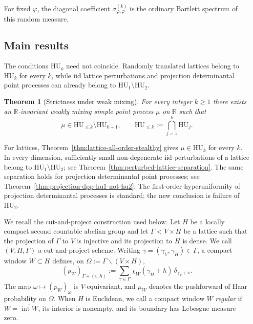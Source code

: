 \documentclass[11pt,reqno,a4paper]{amsart}
\numberwithin{equation}{section}
\theoremstyle{compact}
\newtheorem{maintheorem}{Theorem}
\theoremstyle{definition}
\theoremstyle{definition}
\newcommand{\HU}{\mathrm{HU}}
\begin{document}
For fixed $\varphi$, the diagonal coefficient
$\sigma^{(k)}_{\varphi,\varphi}$ is the ordinary Bartlett spectrum of this
random measure.

\subsection{Main results}
\label{subsec:intro-main-results}

The conditions $\HU_k$ need not coincide.  Randomly translated lattices
belong to $\HU_k$ for every $k$, while iid lattice perturbations and
projection determinantal point processes can already belong to
$\HU_1\setminus\HU_2$.

\begin{maintheorem}[Strictness under weak mixing]
\label{thm:intro-weak-mixing}
For every integer $k\geq1$ there exists an $\mathbb R$-invariant weakly
mixing simple point process $\mu$ on $\mathbb R$ such that
\begin{equation}\label{eq:intro-weak-mixing}
  \mu\in\HU_{\leq k}\setminus\HU_{k+1},
  \qquad
  \HU_{\leq k}:=\bigcap_{j=1}^k\HU_j.
\end{equation}
\end{maintheorem}

For lattices, Theorem~\ref{thm:lattice-all-order-stealthy} gives
$\mu\in\HU_k$ for every $k$.  In every dimension, sufficiently small
non-degenerate iid perturbations of a lattice belong to
$\HU_1\setminus\HU_2$; see Theorem~\ref{thm:perturbed-lattice-separation}.  The same separation holds
for projection determinantal point processes; see
Theorem~\ref{thm:projection-dpp-hu1-not-hu2}.  The first-order
hyperuniformity of projection determinantal processes is standard; the new
conclusion is failure of $\HU_2$.

We recall the cut-and-project construction used below.  Let $H$ be a locally
compact second countable abelian group and let $\Gamma<V\times H$ be a
lattice such that the projection of $\Gamma$ to $V$ is injective and its
projection to $H$ is dense.  We call $(V,H,\Gamma)$ a cut-and-project
scheme.  Writing $\gamma=(\gamma_V,\gamma_H)\in\Gamma$, a compact window
$W\subset H$ defines, on $\Omega:=\Gamma\backslash(V\times H)$,
\[
  (p_W)_{\Gamma+(v,h)}
  :=\sum_{\gamma\in\Gamma}
     \chi_W(\gamma_H+h)\,\delta_{\gamma_V+v}.
\]
The map $\omega\mapsto(p_W)_\omega$ is $V$-equivariant, and $\mu_W$ denotes
the pushforward of Haar probability on $\Omega$.  When $H$ is Euclidean, we
call a compact window $W$ \emph{regular} if
$W=\overline{\operatorname{int}W}$, its interior is nonempty, and its boundary
has Lebesgue measure zero.
\end{document}
